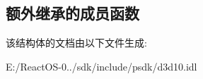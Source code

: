 \subsection*{额外继承的成员函数}


该结构体的文档由以下文件生成\+:\begin{DoxyCompactItemize}
\item 
E\+:/\+React\+O\+S-\/0../sdk/include/psdk/d3d10.\+idl\end{DoxyCompactItemize}
